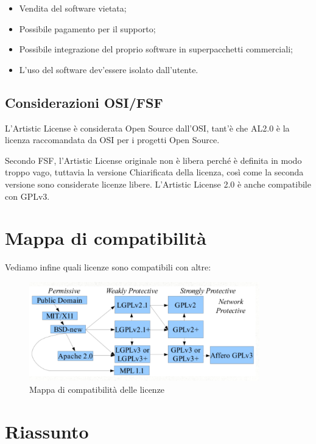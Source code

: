 \begin{itemize}

\item Vendita del software vietata;
\item Possibile pagamento per il supporto;
\item Possibile integrazione del proprio software in superpacchetti commerciali;
\item L'uso del software dev'essere isolato dall'utente.

\end{itemize}

\subsection{Considerazioni OSI/FSF}

L'Artistic License è considerata Open Source dall'OSI, tant'è che AL2.0 è la licenza raccomandata da OSI per i progetti Open Source.

Secondo FSF, l'Artistic License originale non è libera perché è definita in modo troppo vago, tuttavia la versione Chiarificata della licenza, così come la seconda versione sono considerate licenze libere. L'Artistic License 2.0 è anche compatibile con GPLv3.

\section{Mappa di compatibilità}

Vediamo infine quali licenze sono compatibili con altre:

\begin{figure}[htp]
\centering
\includegraphics[width=100mm]{images/license-compatibility.png}
\caption{Mappa di compatibilità delle licenze}
\end{figure}

\section{Riassunto}


